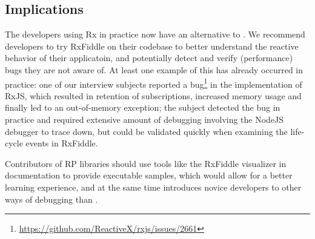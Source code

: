 \subsection{Implications}
The developers using Rx in practice now have an alternative to \printfdebugging{}. 
We recommend developers to try RxFiddle on their codebase to better understand the reactive behavior of their applicatoin, 
and potentially detect and verify (performance) bugs they are not aware of.
At least one example of this has already occurred in practice:
one of our interview subjects reported a bug\footnote{\url{https://github.com/ReactiveX/rxjs/issues/2661}} in the  implementation of RxJS,
which resulted in retention of subscriptions, increased memory usage and finally led to an out-of-memory exception;
the subject detected the bug in practice and required extensive amount of debugging involving the NodeJS debugger to trace down,
but could be validated quickly when examining the life-cycle events in RxFiddle.

Contributors of RP libraries should use tools like the RxFiddle visualizer in documentation to provide executable samples,
which would allow for a better learning experience, 
and at the same time introduces novice developers to other ways of debugging than \printfdebugging{}.
